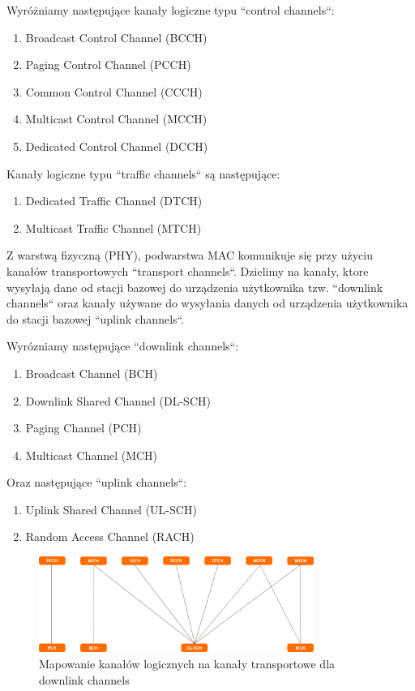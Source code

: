 Wyróżniamy następujące kanały logiczne typu ``control channels``:

\begin{enumerate}
	\item Broadcast Control Channel (BCCH)
	\item Paging Control Channel (PCCH)
	\item Common Control Channel (CCCH)
	\item Multicast Control Channel (MCCH)
	\item Dedicated Control Channel (DCCH)
\end{enumerate}

Kanały logiczne typu ``traffic channels`` są następujące:

\begin{enumerate}
	\item Dedicated Traffic Channel (DTCH)
	\item Multicast Traffic Channel (MTCH)
\end{enumerate}

Z warstwą fizyczną (PHY), podwarstwa MAC komunikuje się przy użyciu kanałów transportowych ``transport channels``. Dzielimy na kanały, ktore wysyłają dane od stacji bazowej do urządzenia użytkownika tzw. ``downlink channels`` oraz kanały używane do wysyłania danych od urządzenia użytkownika do stacji bazowej ``uplink channels``.

Wyrózniamy następujące ``downlink channels``:

\begin{enumerate}
	\item Broadcast Channel (BCH)
	\item Downlink Shared Channel (DL-SCH)
	\item Paging Channel (PCH)
	\item Multicast Channel (MCH)
\end{enumerate}

Oraz następujące ``uplink channels``:

\begin{enumerate}
	\item Uplink Shared Channel (UL-SCH)
	\item Random Access Channel (RACH)
\end{enumerate}

\begin{figure}
	\centerline{\includegraphics[width=0.8\textwidth]{images/mac_downlink_mapping.png}}
	\caption{Mapowanie kanałów logicznych na kanały transportowe dla downlink channels}
	\label{fig:mac_downlink_mapping}
\end{figure}

